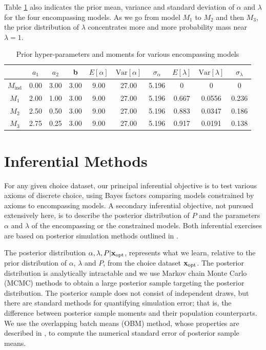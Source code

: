 \documentclass[11pt,letter]{article}
\begin{document}
Table \ref{t:hyper} also indicates the prior mean, variance and standard deviation of $\alpha$ and $\lambda$ for the four encompassing models.
As we go from model $M_1$ to $M_2$ and then $M_3$, the prior distribution of $\lambda$ concentrates more and more probability mass near $\lambda = 1$.

\begin{table}
  \centering
  \begin{tabular}{cccccccccc}
    & $a_1$ & $a_2$ & b &
    $E[\alpha]$ & $\mathrm{Var}[\alpha]$ & $\sigma_\alpha$ & $E[\lambda]$ & $\mathrm{Var}[\lambda]$ & $\sigma_\lambda$ \\
    \hline
    $M_{\mathrm{ind}}$ & 0.00 & 3.00 & 3.00 & 9.00 & 27.00 & 5.196 & 0 & 0 & 0 \\
    \hline
    $M_1$ & 2.00 & 1.00 & 3.00 & 9.00 & 27.00 & 5.196 & 0.667 & 0.0556 & 0.236 \\
    $M_2$ & 2.50 & 0.50 & 3.00 & 9.00 & 27.00 & 5.196 & 0.883 & 0.0347 & 0.186 \\
    $M_3$ & 2.75 & 0.25 & 3.00 & 9.00 & 27.00 & 5.196 & 0.917 & 0.0191 & 0.138 \\
    \hline
  \end{tabular}\caption{Prior hyper-parameters and moments for various encompassing models}\label{t:hyper}
\end{table}

\section{Inferential Methods}\label{s:inference}

For any given choice dataset, our principal inferential objective is to test various axioms of discrete choice, using Bayes factors comparing models constrained by axioms to encompassing models.
A secondary inferential objective, not pursued extensively here, is to describe the posterior distribution of $P$ and the parameters $\alpha$ and $\lambda$ of the encompassing or the constrained models.
Both inferential exercises are based on posterior simulation methods outlined in .

The posterior distribution $\alpha,\lambda,P|{\bf x}_\mathrm{opt}$, represents what we learn, relative to the prior distribution of $\alpha$, $\lambda$ and $P$, from the choice dataset ${\bf x}_\mathrm{opt}$.
The posterior distribution is analytically intractable and we use Markov chain Monte Carlo (MCMC) methods to obtain a large posterior sample targeting the posterior distribution.
The posterior sample does not consist of independent draws, but there are standard methods for quantifying simulation error; that is, the difference between posterior sample moments and their population counterparts.
We use the overlapping batch means (OBM) method, whose properties are described in , to compute the numerical standard error of posterior sample means.
\end{document}
